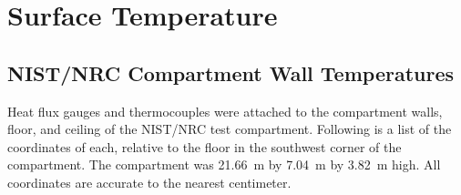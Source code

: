 \chapter{Surface Temperature}

\clearpage

\section{NIST/NRC Compartment Wall Temperatures}

Heat flux gauges and thermocouples were attached to the compartment walls, floor, and ceiling of the NIST/NRC test compartment. Following is a list of the
coordinates of each, relative to the floor in the southwest corner of the compartment. The compartment was 21.66~m by 7.04~m by 3.82~m high. All coordinates are
accurate to the nearest centimeter.

